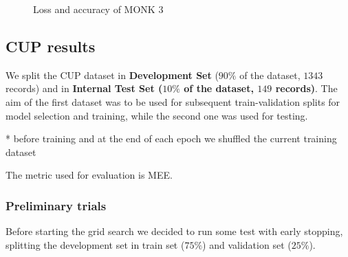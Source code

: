 \begin{figure}
    \centering
    \caption{Loss and accuracy of MONK 3}
    \label{fig:monk3}
\end{figure}

\subsection{CUP results}

We split the CUP dataset in \textbf{Development Set} ($90\%$ of the dataset, $1343$ records) and in  \textbf{Internal Test Set ($10\%$ of the dataset, $149$ records)}. The aim of the first dataset was to be used for subsequent train-validation splits for model selection and training, while the second one was used for testing. 

 * before training and at the end of each epoch we shuffled the current training dataset

 The metric used for evaluation is MEE.

\subsubsection{Preliminary trials}

Before starting the grid search we decided to run some test with early stopping, splitting the development set in train set ($75\%$) and validation set ($25\%$). 

